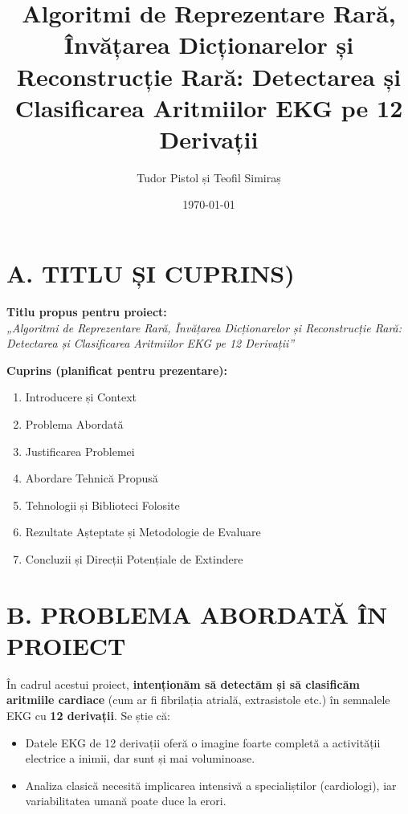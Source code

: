 \documentclass[12pt]{article}
\begin{document}
\title{\textbf{Algoritmi de Reprezentare Rară, Învățarea Dicționarelor și Reconstrucție Rară: Detectarea și Clasificarea Aritmiilor EKG pe 12 Derivații}}
\author{Tudor Pistol și Teofil Simiraș}
\date{\today}
\maketitle

\tableofcontents

\section{A. TITLU ȘI CUPRINS)}

\textbf{Titlu propus pentru proiect:}\\
\emph{„Algoritmi de Reprezentare Rară, Învățarea Dicționarelor și Reconstrucție Rară: Detectarea și Clasificarea Aritmiilor EKG pe 12 Derivații”}

\textbf{Cuprins (planificat pentru prezentare):}
\begin{enumerate}
    \item Introducere și Context
    \item Problema Abordată
    \item Justificarea Problemei
    \item Abordare Tehnică Propusă
    \item Tehnologii și Biblioteci Folosite
    \item Rezultate Așteptate și Metodologie de Evaluare
    \item Concluzii și Direcții Potențiale de Extindere
\end{enumerate}

\section{B. PROBLEMA ABORDATĂ ÎN PROIECT}

În cadrul acestui proiect, \textbf{intenționăm să detectăm și să clasificăm aritmiile cardiace} (cum ar fi fibrilația atrială, extrasistole etc.) în semnalele EKG cu \textbf{12 derivații}. Se știe că:

\begin{itemize}
    \item Datele EKG de 12 derivații oferă o imagine foarte completă a activității electrice a inimii, dar sunt și mai voluminoase.
    \item Analiza clasică necesită implicarea intensivă a specialiștilor (cardiologi), iar variabilitatea umană poate duce la erori.
\end{itemize}
\end{document}
